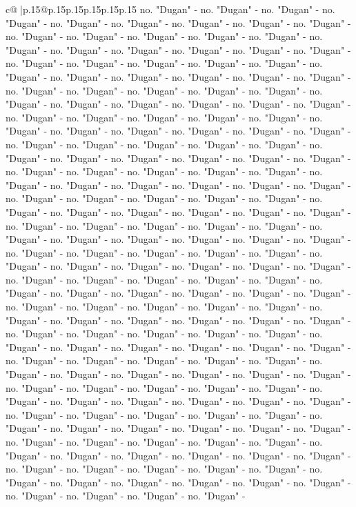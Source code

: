 \documentclass{article}
\begin{document}
{\begin{supertabular}{c@{$\;$}|p{.15\linewidth}@{}p{.15\linewidth}p{.15\linewidth}p{.15\linewidth}p{.15\linewidth}p{.15\linewidth}}
{{{no. "Dugan" {-} no. "Dugan" {-} no. "Dugan" {-} no. "Dugan" {-} no. "Dugan" {-} no. "Dugan" {-} no. "Dugan" {-} no. "Dugan" {-} no. "Dugan" {-} no. "Dugan" {-} no. "Dugan" {-} no. "Dugan" {-} no. "Dugan" {-} no. "Dugan" {-} no. "Dugan" {-} no. "Dugan" {-} no. "Dugan" {-} no. "Dugan" {-} no. "Dugan" {-} no. "Dugan" {-} no. "Dugan" {-} no. "Dugan" {-} no. "Dugan" {-} no. "Dugan" {-} no. "Dugan" {-} no. "Dugan" {-} no. "Dugan" {-} no. "Dugan" {-} no. "Dugan" {-} no. "Dugan" {-} no. "Dugan" {-} no. "Dugan" {-} no. "Dugan" {-} no. "Dugan" {-} no. "Dugan" {-} no. "Dugan" {-} no. "Dugan" {-} no. "Dugan" {-} no. "Dugan" {-} no. "Dugan" {-} no. "Dugan" {-} no. "Dugan" {-} no. "Dugan" {-} no. "Dugan" {-} no. "Dugan" {-} no. "Dugan" {-} no. "Dugan" {-} no. "Dugan" {-} no. "Dugan" {-} no. "Dugan" {-} no. "Dugan" {-} no. "Dugan" {-} no. "Dugan" {-} no. "Dugan" {-} no. "Dugan" {-} no. "Dugan" {-} no. "Dugan" {-} no. "Dugan" {-} no. "Dugan" {-} no. "Dugan" {-} no. "Dugan" {-} no. "Dugan" {-} no. "Dugan" {-} no. "Dugan" {-} no. "Dugan" {-} no. "Dugan" {-} no. "Dugan" {-} no. "Dugan" {-} no. "Dugan" {-} no. "Dugan" {-} no. "Dugan" {-} no. "Dugan" {-} no. "Dugan" {-} no. "Dugan" {-} no. "Dugan" {-} no. "Dugan" {-} no. "Dugan" {-} no. "Dugan" {-} no. "Dugan" {-} no. "Dugan" {-} no. "Dugan" {-} no. "Dugan" {-} no. "Dugan" {-} no. "Dugan" {-} no. "Dugan" {-} no. "Dugan" {-} no. "Dugan" {-} no. "Dugan" {-} no. "Dugan" {-} no. "Dugan" {-} no. "Dugan" {-} no. "Dugan" {-} no. "Dugan" {-} no. "Dugan" {-} no. "Dugan" {-} no. "Dugan" {-} no. "Dugan" {-} no. "Dugan" {-} no. "Dugan" {-} no. "Dugan" {-} no. "Dugan" {-} no. "Dugan" {-} no. "Dugan" {-} no. "Dugan" {-} no. "Dugan" {-} no. "Dugan" {-} no. "Dugan" {-} no. "Dugan" {-} no. "Dugan" {-} no. "Dugan" {-} no. "Dugan" {-} no. "Dugan" {-} no. "Dugan" {-} no. "Dugan" {-} no. "Dugan" {-} no. "Dugan" {-} no. "Dugan" {-} no. "Dugan" {-} no. "Dugan" {-} no. "Dugan" {-} no. "Dugan" {-} no. "Dugan" {-} no. "Dugan" {-} no. "Dugan" {-} no. "Dugan" {-} no. "Dugan" {-} no. "Dugan" {-} no. "Dugan" {-} no. "Dugan" {-} no. "Dugan" {-} no. "Dugan" {-} no. "Dugan" {-} no. "Dugan" {-} no. "Dugan" {-} no. "Dugan" {-} no. "Dugan" {-} no. "Dugan" {-} no. "Dugan" {-} no. "Dugan" {-} no. "Dugan" {-} no. "Dugan" {-} no. "Dugan" {-} no. "Dugan" {-} no. "Dugan" {-} no. "Dugan" {-} no. "Dugan" {-} no. "Dugan" {-} no. "Dugan" {-} no. "Dugan" {-} no. "Dugan" {-} no. "Dugan" {-} no. "Dugan" {-} no. "Dugan" {-} no. "Dugan" {-} no. "Dugan" {-} no. "Dugan" {-} no. "Dugan" {-} no. "Dugan" {-} no. "Dugan" {-} no. "Dugan" {-} no. "Dugan" {-} no. "Dugan" {-} no. "Dugan" {-} no. "Dugan" {-} no. "Dugan" {-} no. "Dugan" {-} no. "Dugan" {-} no. "Dugan" {-} no. "Dugan" {-} no. "Dugan" {-} no. "Dugan" {-} no. "Dugan" {-} no. "Dugan" {-} no. "Dugan" {-} no. "Dugan" {-} no. "Dugan" {-} no. "Dugan" {-} no. "Dugan" {-} no. "Dugan" {-} no. "Dugan" {-} no. "Dugan" {-} no. "Dugan" {-} no. "Dugan" {-} no. "Dugan" {-} no. "Dugan" {-} no. "Dugan" {-} no. "Dugan" {-} no. "Dugan" {-} no. "Dugan" {-} no. "Dugan" {-} no. "Dugan" {-} no. "Dugan" {-} no. "Dugan" {-} no. "Dugan" {-} no. "Dugan" {-} no. "Dugan" {-} no. "Dugan" {-} no. "Dugan" {-} no. "Dugan" {-} no. "Dugan" {-} }}}
\end{supertabular}}
\end{document}
